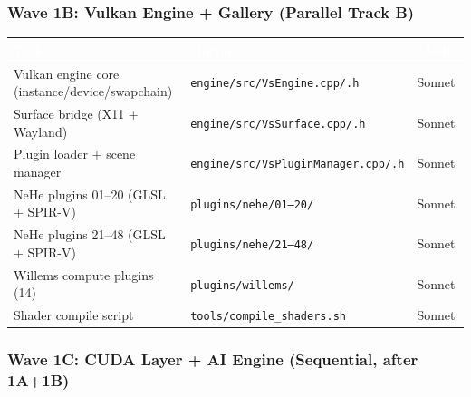 \documentclass[11pt,letterpaper]{article}
\newcommand{\tableheader}[1]{\textbf{\sffamily\textcolor{white}{#1}}}
\begin{document}
\subsubsection{Wave 1B: Vulkan Engine + Gallery (Parallel Track B)}

\begin{center}
\begin{tabularx}{\textwidth}{L{3.5cm}XC{1.5cm}}
\toprule
{}
\tableheader{Task} & \tableheader{Output} & \tableheader{Model} \\
\midrule
Vulkan engine core (instance/device/swapchain) & \texttt{engine/src/VsEngine.cpp/.h} & Sonnet \\
Surface bridge (X11 + Wayland) & \texttt{engine/src/VsSurface.cpp/.h} & Sonnet \\
Plugin loader + scene manager & \texttt{engine/src/VsPluginManager.cpp/.h} & Sonnet \\
NeHe plugins 01--20 (GLSL + SPIR-V) & \texttt{plugins/nehe/01--20/} & Sonnet \\
NeHe plugins 21--48 (GLSL + SPIR-V) & \texttt{plugins/nehe/21--48/} & Sonnet \\
Willems compute plugins (14) & \texttt{plugins/willems/} & Sonnet \\
Shader compile script & \texttt{tools/compile\_shaders.sh} & Sonnet \\
\bottomrule
\end{tabularx}
\end{center}

\subsubsection{Wave 1C: CUDA Layer + AI Engine (Sequential, after 1A+1B)}
\end{document}
